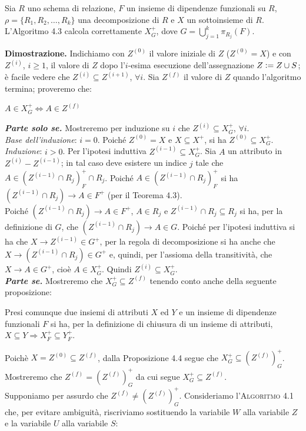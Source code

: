 \begin{theo}
Sia $R$ uno schema di relazione, $F$ un insieme di dipendenze funzionali su $R$, $\rho =\{R_1, R_2, \ldots, R_k\}$
una decomposizione di $R$ e $X$ un sottoinsieme di $R$. L'Algoritmo 4.3 calcola correttamente $X^{+}_G$, dove 
$G = \bigcup_{j=1}^k \pi_{R_j}(F)$.
\end{theo}
\textbf{Dimostrazione.} Indichiamo con $Z^{(0)}$ il valore iniziale di $Z$ ($Z^{(0)} = X$) e con $Z^{(i)}$, $i \geq 
1$, il valore di $Z$ dopo l'$i$-esima esecuzione dell'assegnazione $Z \vcentcolon= Z \cup S$; è facile vedere che 
$Z^{(i)} \subseteq Z^{(i+1)}$, $\forall i$. Sia $Z^{(f)}$ il valore di $Z$ quando l'algoritmo termina; proveremo che:
\begin{center}
\begin{math}
  A \in X^{+}_G \Leftrightarrow  A \in Z^{(f)} 
\end{math}
\end{center}
\textbf{\emph{Parte solo se.}} Mostreremo per induzione su $i$ che $Z^{(i)} \subseteq X^{+}_G$, $\forall i$.\\
\emph{Base dell'induzione}: $i=0$. Poiché $Z^{(0)} = X$ e $X \subseteq X^+$, si ha $Z^{(0)} \subseteq X^{+}_G$.\\
\emph{Induzione}: $i >0$. Per l'ipotesi induttiva $Z^{(i-1)} \subseteq X^{+}_G$. Sia $A$ un attributo in $Z^{(i)}
-Z^{(i-1)}$; in tal caso deve esistere un indice $j$ tale che $A \in (Z^{(i-1)} \cap R_j)^{+}_F \cap R_j$. Poiché
$A \in (Z^{(i-1)} \cap R_j)^{+}_F$ si ha $(Z^{(i-1)} \cap R_j) \rightarrow A \in F^+$ (per il Teorema 4.3).\\
Poiché $(Z^{(i-1)} \cap R_j) \rightarrow A \in F^+$, $A \in R_j$ e $Z^{(i-1)} \cap R_j \subseteq R_j$ si ha, per 
la definizione di $G$, che $(Z^{(i-1)} \cap R_j) \rightarrow A \in G$. Poiché per l'ipotesi induttiva si ha che 
$X \rightarrow Z^{(i-1)} \in G^+$, per la regola di decomposizione si ha anche che $X \rightarrow (Z^{(i-1)} 
\cap R_j) \in G^+$ e, quindi, per l'assioma della transitività, che $X \rightarrow A \in G^+$, cioè $A \in X^{+}_G$.
Quindi $Z^{(i)} \subseteq X^{+}_G$.\\
\textbf{\emph{Parte se.}} Mostreremo che $X^{+}_G \subseteq Z^{(f)}$ tenendo conto anche della seguente proposizione:
\begin{prop}
Presi comunque due insiemi di attributi $X$ ed $Y$ e un insieme di dipendenze funzionali $F$ si ha, per la 
definizione di chiusura di un insieme di attributi, $X \subseteq Y \Rightarrow X^{+}_F \subseteq Y^{+}_F$. 
\end{prop}
Poichè $X = Z^{(0)} \subseteq Z^{(f)}$, dalla Proposizione 4.4 segue che $X^{+}_G \subseteq (Z^{(f)})^{+}_G$. 
Mostreremo che $Z^{(f)} = (Z^{(f)})^+_G$ da cui segue $X^+_G \subseteq Z^{(f)}.$\\
Supponiamo per assurdo che $Z^{(f)}\not =(Z^{(f)})^+_G$. Consideriamo l'\textsc{Algoritmo 4.1} che, per evitare ambiguità,
riscriviamo sostituendo la variabile $W$ alla variabile $Z$ e la variabile $U$ alla variabile $S$:\\


